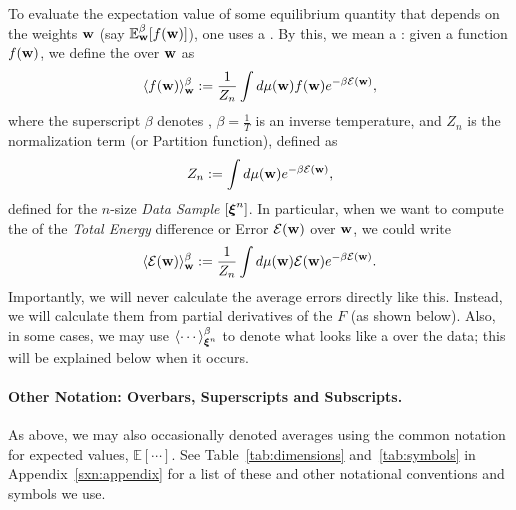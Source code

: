 {To evaluate the expectation value of some equilibrium quantity that depends on the weights ${\mathbf{w}}$ (say $\mathbb{E}^{\beta}_{{\mathbf{w}}}[f({\mathbf{w}})]$), one uses a \ThermalAverage.
By this, we mean a \emph{\BoltzmannWeightedAverage}: given a function $f({\mathbf{w}})$,
we define the \ThermalAverage over ${\mathbf{w}}$ as
\begin{align}
\label{eqn:thrmavg}
\langle f({\mathbf{w}})\rangle_{{\mathbf{w}}}^{{\beta}}:=\dfrac{1}{Z_{n}}\int d\mu({\mathbf{w}}) f({\mathbf{w}})e^{-\beta \mathcal{E}(\mathbf{w})}  ,
\end{align}
where the superscript $\beta$ denotes \ThermalAverage,
$\beta=\frac{1}{T}$ is an inverse temperature, and 
$Z_{n}$ is the normalization term (or Partition function), defined as
\begin{align}
\label{eqn:Zwn}
Z_{n}:=\int d\mu({\mathbf{w}}) e^{-\beta \mathcal{E}(\mathbf{w})},
\end{align}
defined for the $n$-size \emph{Data Sample} $[\boldsymbol{\xi}^{n}]$.
%
In particular, when we want to compute the \ThermalAverage of the \emph{Total Energy} difference or Error
$\mathcal{E}(\mathbf{w})$ over ${\mathbf{w}}$, we could write
\begin{align}
\label{eqn:Detot}
\langle \mathcal{E}(\mathbf{w}) \rangle^{\beta}_{{\mathbf{w}}}:=\dfrac{1}{Z_{n}}\int d\mu({\mathbf{w}}) \mathcal{E}(\mathbf{w}) e^{-\beta \mathcal{E}(\mathbf{w})} .
\end{align}
Importantly, we will never calculate the average errors directly like this.
Instead, we will calculate them from partial derivatives of the \FreeEnergy $F$ (as shown below).
Also, in some cases, we may use $\langle \cdots \rangle^{\beta}_{\boldsymbol{\xi}^{n}}$ to denote what looks like a \ThermalAverage over the data; this will be explained below when it occurs.

\paragraph{Other Notation: Overbars, Superscripts and Subscripts.}
As above, we may also occasionally denoted averages using the common notation for expected values, $\mathbb{E}[\cdots]$.
See Table~\ref{tab:dimensions} and~\ref{tab:symbols} in Appendix~\ref{sxn:appendix} for a list of these and other notational conventions and symbols we use.

}
